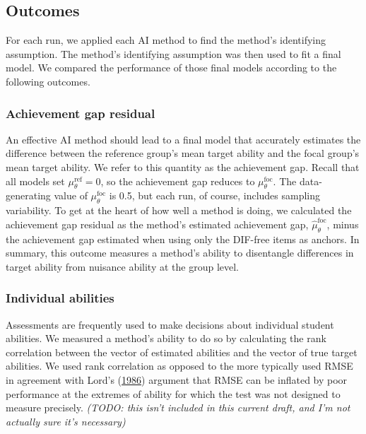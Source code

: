 \documentclass[
  11pt,
]{article}
\begin{document}
\hypertarget{outcomes}{%
\subsection{Outcomes}\label{outcomes}}

For each run, we applied each AI method to find the method's identifying assumption. The method's identifying assumption was then used to fit a final model. We compared the performance of those final models according to the following outcomes.

\hypertarget{achievement-gap-residual}{%
\subsubsection{Achievement gap residual}\label{achievement-gap-residual}}

An effective AI method should lead to a final model that accurately estimates the difference between the reference group's mean target ability and the focal group's mean target ability. We refer to this quantity as the achievement gap. Recall that all models set \(\mu_\theta^\text{ref} = 0\), so the achievement gap reduces to \(\mu_\theta^\text{foc}\). The data-generating value of \(\mu_\theta^\text{foc}\) is 0.5, but each run, of course, includes sampling variability. To get at the heart of how well a method is doing, we calculated the achievement gap residual as the method's estimated achievement gap, \(\hat\mu_\theta^\text{foc}\), minus the achievement gap estimated when using only the DIF-free items as anchors. In summary, this outcome measures a method's ability to disentangle differences in target ability from nuisance ability at the group level.

\hypertarget{individual-abilities}{%
\subsubsection{Individual abilities}\label{individual-abilities}}

Assessments are frequently used to make decisions about individual student abilities. We measured a method's ability to do so by calculating the rank correlation between the vector of estimated abilities and the vector of true target abilities. We used rank correlation as opposed to the more typically used RMSE in agreement with Lord's (\protect\hyperlink{ref-lord1986maximum}{1986}) argument that RMSE can be inflated by poor performance at the extremes of ability for which the test was not designed to measure precisely. \emph{(TODO: this isn't included in this current draft, and I'm not actually sure it's necessary)}
\end{document}
